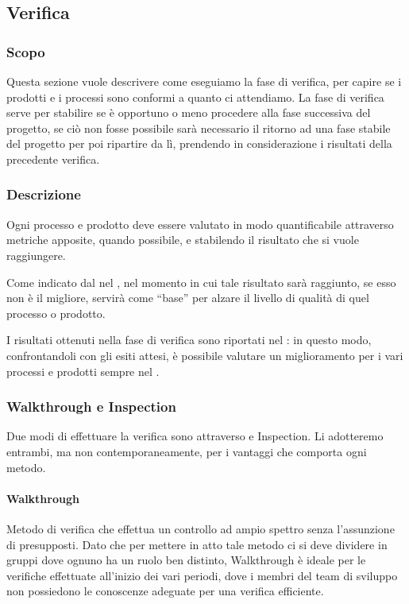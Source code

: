 	\subsection{Verifica}\label{Verifica}

		\subsubsection{Scopo}
		Questa sezione vuole descrivere come eseguiamo la fase di verifica, per capire se i prodotti e i processi sono conformi a quanto ci attendiamo.
		La fase di verifica serve per stabilire se è opportuno o meno procedere alla fase successiva del progetto, se ciò non fosse possibile sarà necessario il
		ritorno ad una fase stabile del progetto per poi ripartire da lì, prendendo in considerazione i risultati della precedente verifica.


		\subsubsection{Descrizione}
		Ogni processo e prodotto deve essere valutato in modo quantificabile attraverso metriche apposite, quando possibile, e stabilendo il risultato che si vuole
		raggiungere.

		Come indicato dal  nel \Doc{\PdQv}, nel momento in cui tale risultato sarà raggiunto, se esso non è il migliore,
		servirà come ``base'' per alzare il livello di qualità di quel processo o prodotto.

		I risultati ottenuti nella fase di verifica sono riportati nel \PdQ: in questo modo, confrontandoli con gli esiti attesi,
		è possibile valutare un miglioramento per i vari processi e prodotti sempre nel \PdQ.

		\subsubsection{Walkthrough e Inspection}
		Due modi di effettuare la verifica sono attraverso  e Inspection.
		Li adotteremo entrambi, ma non contemporaneamente, per i vantaggi che comporta ogni metodo.

			\paragraph{Walkthrough}
			Metodo di verifica che effettua un controllo ad ampio spettro senza l’assunzione di presupposti. Dato che per mettere in atto tale metodo ci
			si deve dividere in gruppi dove ognuno ha un ruolo ben distinto, Walkthrough è ideale per le verifiche effettuate all'inizio dei vari periodi,
			dove i membri del team di sviluppo non possiedono le conoscenze adeguate per una verifica efficiente.

